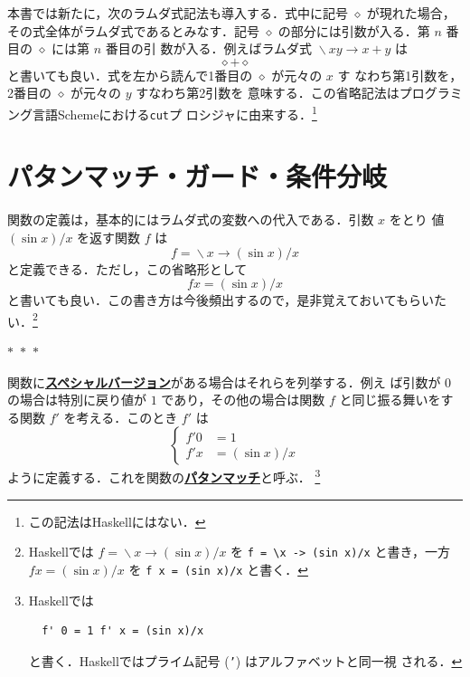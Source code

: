 \documentclass[a5paper,twoside,fleqn,draft]{jsbook}
\newcommand{\separator}{\begin{center}$*$~$*$~$*$\end{center}}
\newcommand{\programminglanguage}[1]{\textsf{#1}}
\newcommand{\haskell}{\programminglanguage{Haskell}}
\newcommand{\scheme}{\programminglanguage{Scheme}}
\newcommand{\keyword}[1]{{\underline{\textbf{#1}}}}
\newcommand{\code}[1]{\texttt{#1}}
\newcommand{\mAnonParam}{\diamond}
\DeclareMathOperator{\mLambda}{\backslash}
\DeclareMathOperator{\mLambdaArrow}{\rightarrow}
\newcommand{\mLambdaExp}[2]{\mLambda{#1}\mLambdaArrow{#2}}
\begin{document}
本書では新たに，次のラムダ式記法も導入する．式中に記号 $\mAnonParam$
が現れた場合，その式全体がラムダ式であるとみなす．記号 $\mAnonParam$
の部分には引数が入る．第 $n$ 番目の $\mAnonParam$ には第 $n$ 番目の引
数が入る．例えばラムダ式 $\mLambdaExp{xy}{x+y}$ は
\begin{equation}
  \mAnonParam+\mAnonParam
\end{equation}
と書いても良い．式を左から読んで1番目の $\mAnonParam$ が元々の $x$ す
なわち第1引数を，2番目の $\mAnonParam$ が元々の $y$ すなわち第2引数を
意味する．この省略記法はプログラミング言語\scheme における\code{cut}プ
ロシジャに由来する．\footnote{この記法は\haskell にはない．}

\section{パタンマッチ・ガード・条件分岐}

関数の定義は，基本的にはラムダ式の変数への代入である．引数 $x$ をとり
値 $(\sin x)/x$ を返す関数 $f$ は
\begin{equation}
  f=\mLambdaExp{x}{(\sin x)/x}
\end{equation}
と定義できる．ただし，この省略形として
\begin{equation}
  fx=(\sin x)/x
\end{equation}
と書いても良い．この書き方は今後頻出するので，是非覚えておいてもらいた
い．\footnote{\haskell では $f=\mLambdaExp{x}{(\sin x)/x}$ を \code{f
    = \textbackslash x -> (sin x)/x} と書き，一方 $fx=(\sin x)/x$ を
  \code{f x = (sin x)/x} と書く．}

\separator

関数に\keyword{スペシャルバージョン}がある場合はそれらを列挙する．例え
ば引数が $0$ の場合は特別に戻り値が $1$ であり，その他の場合は関数 $f$
と同じ振る舞いをする関数 $f'$ を考える．このとき $f'$ は
\begin{equation}
  \left\{
  \begin{aligned}
    f'0&=1\\
    f'x&=(\sin x)/x
  \end{aligned}
  \right.
\end{equation}
ように定義する．これを関数の\keyword{パタンマッチ}と呼ぶ．
\footnote{\haskell では
\begin{verbatim}
  f' 0 = 1 f' x = (sin x)/x
\end{verbatim}
と書く．\haskell ではプライム記号 (\code{'}) はアルファベットと同一視
される．}
\end{document}
